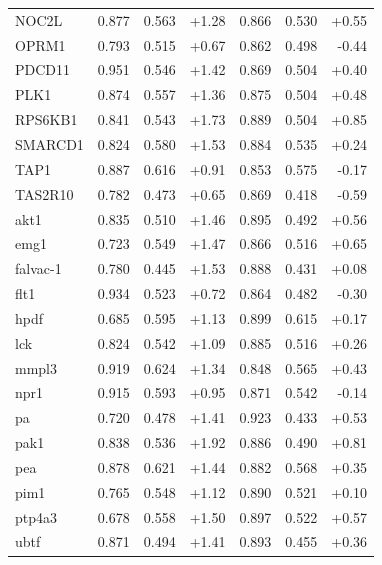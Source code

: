 \begin{center}
\begin{longtable}{lrrrrrr}
NOC2L & 0.877 & 0.563 & +1.28 & 0.866 & 0.530 & +0.55\\
OPRM1 & 0.793 & 0.515 & +0.67 & 0.862 & 0.498 & -0.44\\
PDCD11 & 0.951 & 0.546 & +1.42 & 0.869 & 0.504 & +0.40\\
PLK1 & 0.874 & 0.557 & +1.36 & 0.875 & 0.504 & +0.48\\
RPS6KB1 & 0.841 & 0.543 & +1.73 & 0.889 & 0.504 & +0.85\\
SMARCD1 & 0.824 & 0.580 & +1.53 & 0.884 & 0.535 & +0.24\\
TAP1 & 0.887 & 0.616 & +0.91 & 0.853 & 0.575 & -0.17\\
TAS2R10 & 0.782 & 0.473 & +0.65 & 0.869 & 0.418 & -0.59\\
akt1 & 0.835 & 0.510 & +1.46 & 0.895 & 0.492 & +0.56\\
emg1 & 0.723 & 0.549 & +1.47 & 0.866 & 0.516 & +0.65\\
falvac-1 & 0.780 & 0.445 & +1.53 & 0.888 & 0.431 & +0.08\\
flt1 & 0.934 & 0.523 & +0.72 & 0.864 & 0.482 & -0.30\\
hpdf & 0.685 & 0.595 & +1.13 & 0.899 & 0.615 & +0.17\\
lck & 0.824 & 0.542 & +1.09 & 0.885 & 0.516 & +0.26\\
mmpl3 & 0.919 & 0.624 & +1.34 & 0.848 & 0.565 & +0.43\\
npr1 & 0.915 & 0.593 & +0.95 & 0.871 & 0.542 & -0.14\\
pa & 0.720 & 0.478 & +1.41 & 0.923 & 0.433 & +0.53\\
pak1 & 0.838 & 0.536 & +1.92 & 0.886 & 0.490 & +0.81\\
pea & 0.878 & 0.621 & +1.44 & 0.882 & 0.568 & +0.35\\
pim1 & 0.765 & 0.548 & +1.12 & 0.890 & 0.521 & +0.10\\
ptp4a3 & 0.678 & 0.558 & +1.50 & 0.897 & 0.522 & +0.57\\
ubtf & 0.871 & 0.494 & +1.41 & 0.893 & 0.455 & +0.36\\
\end{longtable}
\end{center}
